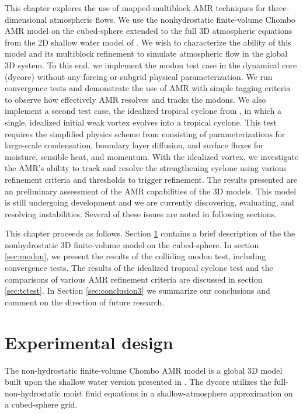 This chapter explores the use of mapped-multiblock AMR techniques for three-dimensional 
atmospheric flows. We use the nonhydrostatic finite-volume Chombo
AMR model on the cubed-sphere extended to the full 3D atmospheric equations from the 
2D shallow water model of \cite{mccorquodale2015adaptive}. We wish to
characterize the ability of this model and its multiblock refinement
to simulate atmospheric flow in the global 3D system. To this end, we 
implement the \cite{lin2017colliding} modon test case in the dynamical core (dycore) without any
forcing or subgrid physical parameterization. We run convergence tests and 
demonstrate the use of AMR with simple tagging criteria to observe how
effectively AMR resolves and tracks the modons. We also implement a second
test case, the idealized tropical cyclone from \cite{reed2011vortex}, in which a single,
idealized initial weak vortex evolves into a tropical cyclone. This test requires
the simplified physics scheme from \cite{reed2012idealized} consisting of parameterizations for large-scale condensation,
boundary layer diffusion, and surface fluxes for moisture, sensible heat, and
momentum. With the idealized vortex, we investigate the AMR's ability to track and resolve
the strengthening cyclone using various refinement criteria and thresholds to trigger 
refinement. The results presented are an preliminary assessment of
the AMR capabilities of the 3D models. This model is still undergoing development and
we are currently discovering, evaluating, and resolving instabilities. Several of these issues are noted in
following sections.

This chapter proceeds as follows. Section \ref{sec:experimental} contains a brief description of the 
the nonhydrostatic 3D finite-volume model on the cubed-sphere.
In section \ref{sec:modon}, we present the results of the colliding modon test,
including convergence tests.  The results of
the idealized tropical cyclone test and the comparisons of
various AMR refinement criteria are discussed in section \ref{sec:tctest}. In Section
\ref{sec:conclusion3} we summarize our conclusions and comment on the direction of future
research.

\section{Experimental design}
\label{sec:experimental}

The non-hydrostatic finite-volume Chombo AMR model
is a global 3D model built upon the shallow water version presented in \cite{mccorquodale2015adaptive}.
The dycore utilizes the full-non-hydrostatic moist fluid equations in a shallow-atmosphere
approximation on a cubed-sphere grid.

